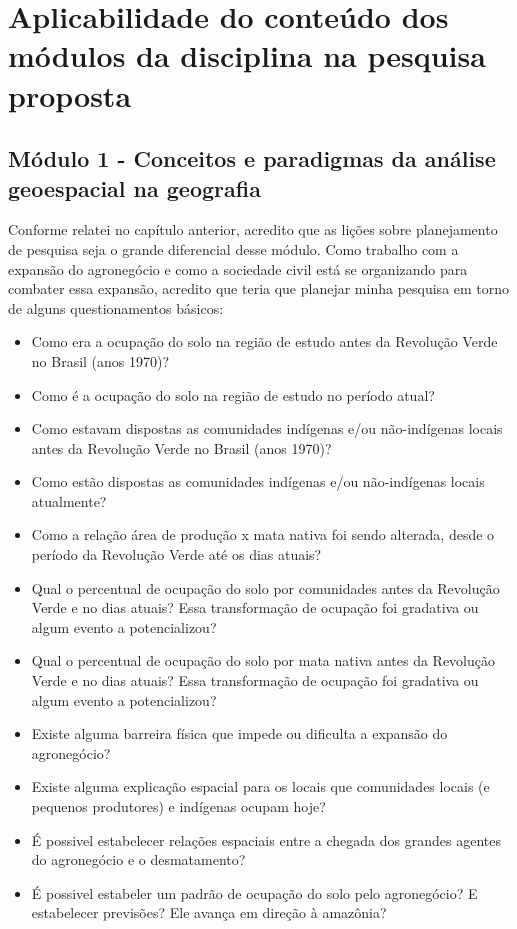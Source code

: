 \section{Aplicabilidade do conteúdo dos módulos da disciplina na pesquisa proposta}

\subsection{Módulo 1 - Conceitos e paradigmas da análise geoespacial na geografia}

Conforme relatei no capítulo anterior, acredito que as lições sobre planejamento de pesquisa seja o grande diferencial desse módulo. Como trabalho com a expansão do agronegócio e como a sociedade civil está se organizando para combater essa expansão, acredito que teria que planejar minha pesquisa em torno de alguns questionamentos básicos:

\begin{itemize}
  \item Como era a ocupação do solo na região de estudo antes da Revolução Verde no Brasil (anos 1970)?
  \item Como é a ocupação do solo na região de estudo no período atual?
  \item Como estavam dispostas as comunidades indígenas e/ou não-indígenas locais antes da Revolução Verde no Brasil (anos 1970)?
  \item Como estão dispostas as comunidades indígenas e/ou não-indígenas locais atualmente?
  \item Como a relação área de produção x mata nativa foi sendo alterada, desde o período da Revolução Verde até os dias atuais?
  \item Qual o percentual de ocupação do solo por comunidades antes da Revolução Verde e no dias atuais? Essa transformação de ocupação foi gradativa ou algum evento a potencializou?
  \item Qual o percentual de ocupação do solo por mata nativa antes da Revolução Verde e no dias atuais? Essa transformação de ocupação foi gradativa ou 
algum evento a potencializou?
  \item Existe alguma barreira física que impede ou dificulta a expansão do agronegócio?
  \item Existe alguma explicação espacial para os locais que comunidades locais (e pequenos produtores) e indígenas ocupam hoje?
  \item É possivel estabelecer relações espaciais entre a chegada dos grandes agentes do agronegócio e o desmatamento?
  \item É possivel estabeler um padrão de ocupação do solo pelo agronegócio? E estabelecer previsões? Ele avança em direção à amazônia?
\end{itemize}


